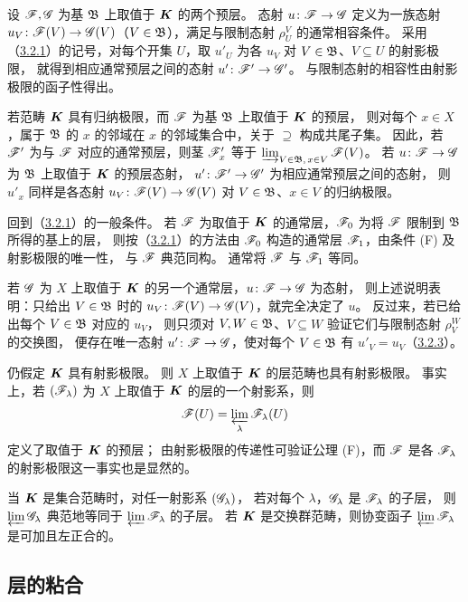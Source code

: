 设 $\mathscr F,\mathscr G$ 为基 $\mathfrak B$ 上取值于 $\boldsymbol K$ 的两个预层。
态射 $u\colon\mathscr F\to\mathscr G$ 定义为一族态射
$u_V\colon\mathscr F(V)\to\mathscr G(V)$（$V\in\mathfrak B$），满足与限制态射 $\rho_U^V$ 的通常相容条件。
采用（\hyperlink{para:0:3.2.1}{3.2.1}）的记号，对每个开集 $U$，取 $u'_U$ 为各 $u_V$ 对 $V\in\mathfrak B$、$V\subseteq U$ 的射影极限，
就得到相应通常预层之间的态射 $u'\colon\mathscr F'\to\mathscr G'$。
与限制态射的相容性由射影极限的函子性得出。

若范畴 $\boldsymbol K$ 具有归纳极限，而 $\mathscr F$ 为基 $\mathfrak B$ 上取值于 $\boldsymbol K$ 的预层，
则对每个 $x\in X$，属于 $\mathfrak B$ 的 $x$ 的邻域在 $x$ 的邻域集合中，关于 $\supseteq$ 构成共尾子集。
因此，若 $\mathscr F'$ 为与 $\mathscr F$ 对应的通常预层，则茎 $\mathscr F'_x$ 等于
$\varinjlim_{V\in\mathfrak B,\,x\in V}\mathscr F(V)$。
若 $u\colon\mathscr F\to\mathscr G$ 为 $\mathfrak B$ 上取值于 $\boldsymbol K$ 的预层态射，
$u'\colon\mathscr F'\to\mathscr G'$ 为相应通常预层之间的态射，
则 $u'_x$ 同样是各态射 $u_V\colon\mathscr F(V)\to\mathscr G(V)$ 对 $V\in\mathfrak B$、$x\in V$ 的归纳极限。

回到（\hyperlink{para:0:3.2.1}{3.2.1}）的一般条件。
若 $\mathscr F$ 为取值于 $\boldsymbol K$ 的通常层，$\mathscr F_0$ 为将 $\mathscr F$ 限制到 $\mathfrak B$ 所得的基上的层，
则按（\hyperlink{para:0:3.2.1}{3.2.1}）的方法由 $\mathscr F_0$ 构造的通常层 $\mathscr F_1$，由条件 (F) 及射影极限的唯一性，
与 $\mathscr F$ 典范同构。
通常将 $\mathscr F$ 与 $\mathscr F_1$ 等同。

若 $\mathscr G$ 为 $X$ 上取值于 $\boldsymbol K$ 的另一个通常层，$u\colon\mathscr F\to\mathscr G$ 为态射，
则上述说明表明：只给出 $V\in\mathfrak B$ 时的 $u_V\colon\mathscr F(V)\to\mathscr G(V)$，就完全决定了 $u$。
反过来，若已给出每个 $V\in\mathfrak B$ 对应的 $u_V$，
则只须对 $V,W\in\mathfrak B$、$V\subseteq W$ 验证它们与限制态射 $\rho_V^W$ 的交换图，
便存在唯一态射 $u'\colon\mathscr F\to\mathscr G$，使对每个 $V\in\mathfrak B$ 有 $u'_V=u_V$（\hyperlink{para:0:3.2.3}{3.2.3}）。

仍假定 $\boldsymbol K$ 具有射影极限。
则 $X$ 上取值于 $\boldsymbol K$ 的层范畴也具有射影极限。
事实上，若 $(\mathscr F_\lambda)$ 为 $X$ 上取值于 $\boldsymbol K$ 的层的一个射影系，则
\[
 \mathscr F(U)=\varprojlim_\lambda\mathscr F_\lambda(U)
\]
定义了取值于 $\boldsymbol K$ 的预层；
由射影极限的传递性可验证公理 (F)，而 $\mathscr F$ 是各 $\mathscr F_\lambda$ 的射影极限这一事实也是显然的。

当 $\boldsymbol K$ 是集合范畴时，对任一射影系 $(\mathscr G_\lambda)$，
若对每个 $\lambda$，$\mathscr G_\lambda$ 是 $\mathscr F_\lambda$ 的子层，
则 $\varprojlim\mathscr G_\lambda$ 典范地等同于 $\varprojlim\mathscr F_\lambda$ 的子层。
若 $\boldsymbol K$ 是交换群范畴，则协变函子 $\varprojlim\mathscr F_\lambda$ 是可加且左正合的。

\subsection{层的粘合}\hypertarget{heading:0:3.3}{}

